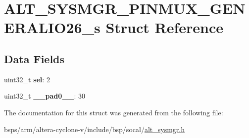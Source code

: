 \hypertarget{structALT__SYSMGR__PINMUX__GENERALIO26__s}{}\section{A\+L\+T\+\_\+\+S\+Y\+S\+M\+G\+R\+\_\+\+P\+I\+N\+M\+U\+X\+\_\+\+G\+E\+N\+E\+R\+A\+L\+I\+O26\+\_\+s Struct Reference}
\label{structALT__SYSMGR__PINMUX__GENERALIO26__s}
\subsection*{Data Fields}
\begin{DoxyCompactItemize}
\item 
\mbox{\label{structALT__SYSMGR__PINMUX__GENERALIO26__s_a6e0798b14c47dbb7ef0710b488ab256e}} 
uint32\+\_\+t {\bfseries sel}\+: 2
\item 
\mbox{\label{structALT__SYSMGR__PINMUX__GENERALIO26__s_aa870d76d8ebe11b3ff14f152c0c91736}} 
uint32\+\_\+t {\bfseries \+\_\+\+\_\+pad0\+\_\+\+\_\+}\+: 30
\end{DoxyCompactItemize}


The documentation for this struct was generated from the following file\+:\begin{DoxyCompactItemize}
\item 
bsps/arm/altera-\/cyclone-\/v/include/bsp/socal/\mbox{\hyperlink{alt__sysmgr_8h}{alt\+\_\+sysmgr.\+h}}\end{DoxyCompactItemize}

